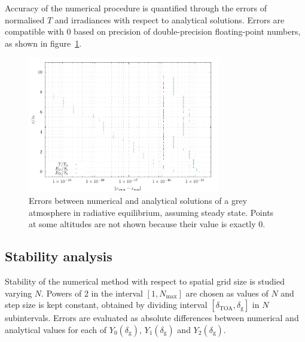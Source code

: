 \documentclass[a4paper,10pt,twocolumn,\classoptions]{article}
\newcommand{\deltaTOA}{\delta_\text{TOA}}
\begin{document}
Accuracy of the numerical procedure is quantified through the errors of normalised $T$ and irradiances with respect to analytical solutions. Errors are compatible with 0 based on precision of double-precision floating-point numbers, as shown in figure~\ref{fig:errors}.
\begin{figure}[h]
  \centering
  \includegraphics*[keepaspectratio=true,width=0.75\textwidth]{errors}
  \caption{Errors between numerical and analytical solutions of a grey atmosphere in radiative equilibrium, assuming steady state. Points at some altitudes are not shown because their value is exactly 0.}
  \label{fig:errors}
\end{figure}

\subsection{Stability analysis}
Stability of the numerical method with respect to spatial grid size is studied varying $N$. Powers of 2 in the interval $[1, N_\text{max}]$ are chosen as values of $N$ and step size is kept constant, obtained by dividing interval $[\deltaTOA, \delta_\text{g}]$ in $N$ subintervals. Errors are evaluated as absolute differences between numerical and analytical values for each of $Y_0(\delta_\text{g})$, $Y_1(\delta_\text{g})$ and $Y_2(\delta_\text{g})$.
\end{document}
